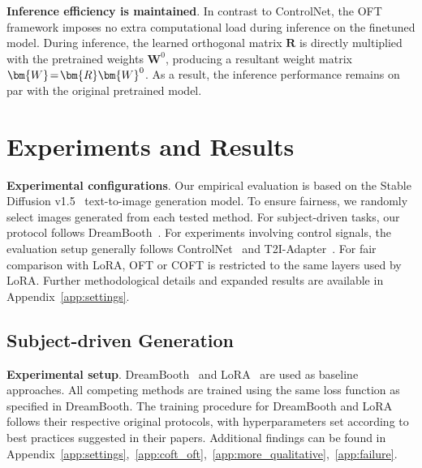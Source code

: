 {\textbf{Inference efficiency is maintained}. In contrast to ControlNet, the OFT framework imposes no extra computational load during inference on the finetuned model. During inference, the learned orthogonal matrix $\bm{R}$ is directly multiplied with the pretrained weights $\bm{W}^0$, producing a resultant weight matrix $\thickmuskip=2mu \medmuskip=2mu \bm{W}=\bm{R}\bm{W}^0$. As a result, the inference performance remains on par with the original pretrained model.

\section{Experiments and Results}

\textbf{Experimental configurations}. Our empirical evaluation is based on the Stable Diffusion v1.5~\cite{rombach2022high} text-to-image generation model. To ensure fairness, we randomly select images generated from each tested method. For subject-driven tasks, our protocol follows DreamBooth~\cite{ruiz2023dreambooth}. For experiments involving control signals, the evaluation setup generally follows ControlNet~\cite{zhang2023adding} and T2I-Adapter~\cite{mou2023t2i}. For fair comparison with LoRA, OFT or COFT is restricted to the same layers used by LoRA. Further methodological details and expanded results are available in Appendix~\ref{app:settings}.

\subsection{Subject-driven Generation}

\textbf{Experimental setup}. DreamBooth~\cite{ruiz2023dreambooth} and LoRA~\cite{hulora2022} are used as baseline approaches. All competing methods are trained using the same loss function as specified in DreamBooth. The training procedure for DreamBooth and LoRA follows their respective original protocols, with hyperparameters set according to best practices suggested in their papers. Additional findings can be found in Appendix~\ref{app:settings},~\ref{app:coft_oft},~\ref{app:more_qualitative},~\ref{app:failure}.

}
